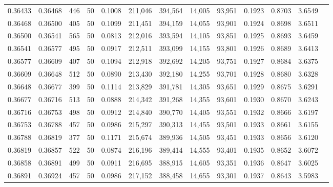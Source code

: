 \begin{tabular}{rrrrrrrrrrrrr}
0.36433 & 0.36468 &   446 &  50 &                                     0.1008 & 211,046 & 394,564 &  14,005 &  93,951 & 0.1923 & 0.8703 & 3.6549 \\
0.36468 & 0.36500 &   405 &  50 &                                     0.1099 & 211,451 & 394,159 &  14,055 &  93,901 & 0.1924 & 0.8698 & 3.6511 \\
0.36500 & 0.36541 &   565 &  50 &                                     0.0813 & 212,016 & 393,594 &  14,105 &  93,851 & 0.1925 & 0.8693 & 3.6459 \\
0.36541 & 0.36577 &   495 &  50 &                                     0.0917 & 212,511 & 393,099 &  14,155 &  93,801 & 0.1926 & 0.8689 & 3.6413 \\
0.36577 & 0.36609 &   407 &  50 &                                     0.1094 & 212,918 & 392,692 &  14,205 &  93,751 & 0.1927 & 0.8684 & 3.6375 \\
0.36609 & 0.36648 &   512 &  50 &                                     0.0890 & 213,430 & 392,180 &  14,255 &  93,701 & 0.1928 & 0.8680 & 3.6328 \\
0.36648 & 0.36677 &   399 &  50 &                                     0.1114 & 213,829 & 391,781 &  14,305 &  93,651 & 0.1929 & 0.8675 & 3.6291 \\
0.36677 & 0.36716 &   513 &  50 &                                     0.0888 & 214,342 & 391,268 &  14,355 &  93,601 & 0.1930 & 0.8670 & 3.6243 \\
0.36716 & 0.36753 &   498 &  50 &                                     0.0912 & 214,840 & 390,770 &  14,405 &  93,551 & 0.1932 & 0.8666 & 3.6197 \\
0.36753 & 0.36788 &   457 &  50 &                                     0.0986 & 215,297 & 390,313 &  14,455 &  93,501 & 0.1933 & 0.8661 & 3.6155 \\
0.36788 & 0.36819 &   377 &  50 &                                     0.1171 & 215,674 & 389,936 &  14,505 &  93,451 & 0.1933 & 0.8656 & 3.6120 \\
0.36819 & 0.36857 &   522 &  50 &                                     0.0874 & 216,196 & 389,414 &  14,555 &  93,401 & 0.1935 & 0.8652 & 3.6072 \\
0.36858 & 0.36891 &   499 &  50 &                                     0.0911 & 216,695 & 388,915 &  14,605 &  93,351 & 0.1936 & 0.8647 & 3.6025 \\
0.36891 & 0.36924 &   457 &  50 &                                     0.0986 & 217,152 & 388,458 &  14,655 &  93,301 & 0.1937 & 0.8643 & 3.5983 \\

\end{tabular}
